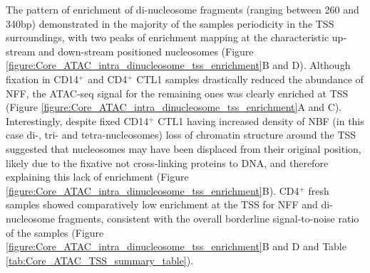 The pattern of enrichment of di-nucleosome fragments (ranging between 260 and 340bp) demonstrated in the majority of the samples periodicity in the TSS surroundings, with two peaks of enrichment mapping at the characteristic up-stream and down-stream positioned nucleosomes (Figure \ref{figure:Core_ATAC_intra_dinucleosome_tss_enrichment}B and D). Although fixation in CD14$^+$ and CD4$^+$ CTL1 samples drastically reduced the abundance of NFF, the ATAC-seq signal for the remaining ones was clearly enriched at TSS (Figure \ref{figure:Core_ATAC_intra_dinucleosome_tss_enrichment}A and C). Interestingly, despite fixed CD14$^+$ CTL1 having increased density of NBF (in this case di-, tri- and tetra-nucleosomes) loss of chromatin structure around the TSS suggested that nucleosomes may have been displaced from their original position, likely due to the fixative not cross-linking proteins to DNA, and therefore explaining this lack of enrichment (Figure \ref{figure:Core_ATAC_intra_dinucleosome_tss_enrichment}B). CD4$^+$ fresh samples showed comparatively low enrichment at the TSS for NFF and di-nucleosome fragments, consistent with the overall borderline signal-to-noise ratio of the samples (Figure \ref{figure:Core_ATAC_intra_dinucleosome_tss_enrichment}B and D and Table \ref{tab:Core_ATAC_TSS_summary_table}).





